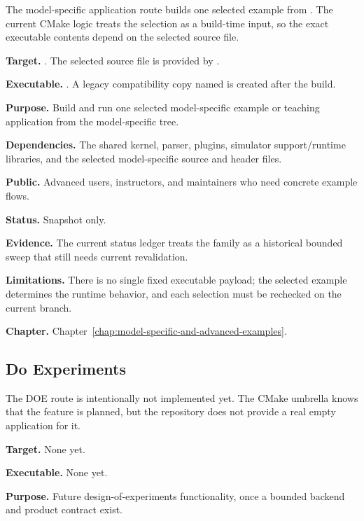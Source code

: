 The model-specific application route builds one selected example from
. The current CMake logic treats the
selection as a build-time input, so the exact executable contents depend on the
selected source file.

\noindent\textbf{Target.} . The selected source file is provided by .

\noindent\textbf{Executable.} . A legacy compatibility copy named  is created after the build.

\noindent\textbf{Purpose.} Build and run one selected model-specific example or teaching application from the model-specific tree.

\noindent\textbf{Dependencies.} The shared kernel, parser, plugins, simulator support/runtime libraries, and the selected model-specific source and header files.

\noindent\textbf{Public.} Advanced users, instructors, and maintainers who need concrete example flows.

\noindent\textbf{Status.} Snapshot only.

\noindent\textbf{Evidence.} The current status ledger treats the family as a historical bounded sweep that still needs current revalidation.

\noindent\textbf{Limitations.} There is no single fixed executable payload; the selected example determines the runtime behavior, and each selection must be rechecked on the current branch.

\noindent\textbf{Chapter.} Chapter~\ref{chap:model-specific-and-advanced-examples}.

\subsection{Do Experiments}
\label{subsec:application-overview-do-experiments}

The DOE route is intentionally not implemented yet. The CMake umbrella knows
that the feature is planned, but the repository does not provide a real empty
application for it.

\noindent\textbf{Target.} None yet.

\noindent\textbf{Executable.} None yet.

\noindent\textbf{Purpose.} Future design-of-experiments functionality, once a bounded backend and product contract exist.

